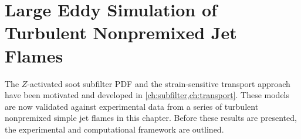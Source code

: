 \chapter{Large Eddy Simulation of Turbulent Nonpremixed Jet Flames\label{ch:lesresults}}


The $Z$-activated soot subfilter PDF and the strain-sensitive transport approach have been motivated and developed in \cref{ch:subfilter,ch:transport}. These models are now validated against experimental data from a series of turbulent nonpremixed simple jet flames in this chapter. Before these results are presented, the experimental and computational framework are outlined. 







